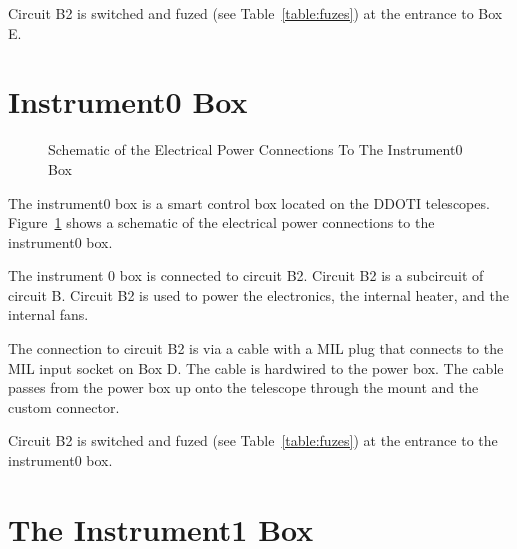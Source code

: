 Circuit B2 is switched and fuzed (see Table~\ref{table:fuzes}) at the entrance to Box E.

\fi

\ifddotioan

\section{Instrument0 Box}

\begin{figure}
\begin{center}
\footnotesize 
{}
\end{center}
\caption{Schematic of the Electrical Power Connections To The Instrument0 Box}
\label{figure:schematic-electrical-power-instrument0-box}
\end{figure}

The instrument0 box is a smart control box located on the DDOTI telescopes. Figure~\ref{figure:schematic-electrical-power-instrument0-box} shows a schematic of the electrical power connections to the instrument0 box.

The instrument 0 box is connected to circuit B2. Circuit B2 is a subcircuit of circuit B. Circuit B2 is used to power the electronics, the internal heater, and the internal fans.

The connection to circuit B2 is via a cable with a MIL plug that connects to the MIL input socket on Box D. The cable is hardwired to the power box. The cable passes from the power box up onto the telescope through the mount and the custom connector.

Circuit B2 is switched and fuzed (see Table~\ref{table:fuzes}) at the entrance to the instrument0 box.

\section{The Instrument1 Box}


